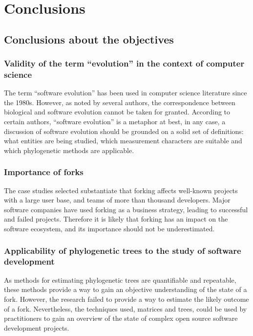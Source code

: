 
\chapter{Conclusions} %

\label{Chapter5} %


\section{Conclusions about the objectives}
\subsection{Validity of the term “evolution” in the context of computer science}
The term “software evolution” has been used in computer science literature since the 1980s. However, as noted by several authors, the correspondence between biological and software evolution cannot be taken for granted. According to certain authors, “software evolution” is a metaphor at best, in any case, a discussion of software evolution should be grounded on a solid set of definitions: what entities are being studied, which measurement characters are suitable and which phylogenetic methods are applicable.

\subsection{Importance of forks}
The case studies selected substantiate that forking affects well-known projects with a large user base, and teams of more than thousand developers. Major software companies have used forking as a business strategy, leading to successful and failed projects. Therefore it is likely that forking has an impact on the software ecosystem, and its importance should not be underestimated.

\subsection{Applicability of phylogenetic trees to the study of software development}
As methods for estimating phylogenetic trees are quantifiable and repeatable, these methods provide a way to gain an objective understanding of the state of a fork. However, the research failed to provide a way to estimate the likely outcome of a fork. Nevertheless, the techniques used, matrices and trees, could be used by practitioners to gain an overview of the state of complex open source software development projects.

